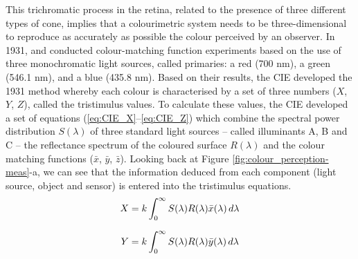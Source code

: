 This trichromatic process in the retina, related to the presence of three different types of cone, implies that a colourimetric system needs to be three-dimensional to reproduce as accurately as possible the colour perceived by an observer. In 1931, \citet{wright_re-determination_1929} and \citet{guild_colorimetric_1931} conducted colour-matching function experiments based on the use of three monochromatic light sources, called primaries: a red (700 nm), a green (546.1 nm), and a blue (435.8 nm). Based on their results, the \gls{CIE} developed the 1931 method whereby each colour is characterised by a set of three numbers ($X$, $Y$, $Z$), called the tristimulus values. To calculate these values, the \gls{CIE} developed a set of equations (\ref{eq:CIE_X}–\ref{eq:CIE_Z}) which combine the spectral power distribution $S(\lambda)$ of three standard light sources – called illuminants A, B and C – the reflectance spectrum of the coloured surface $R(\lambda)$ and the colour matching functions ($\bar{x}$, $\bar{y}$, $\bar{z}$). Looking back at Figure \ref{fig:colour_perception-meas}-a, we can see that the information deduced from each component (light source, object and sensor) is entered into the tristimulus equations.  \\

\begin{equation}
    X = k\int_{0}^{\infty} S(\lambda) R(\lambda) \bar{x}(\lambda) \,d\lambda \\
\label{eq:CIE_X}
\end{equation}  

\begin{equation}
    Y = k\int_{0}^{\infty} S(\lambda) R(\lambda) \bar{y}(\lambda) \,d\lambda \\
\label{eq:CIE_Y}
\end{equation} 

